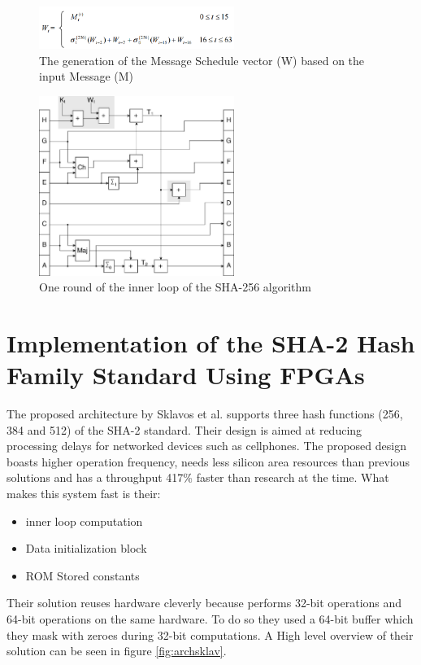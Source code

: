 \documentclass[conference]{IEEEtran}
\begin{document}
\begin{figure}[!t]
\centering
\includegraphics[width=2.5in]{messageSchedule}
\caption{The generation of the Message Schedule vector (W) based on the input Message (M)}
\label{fig:messageSchedule}
\end{figure}

\begin{figure}[!t]
\centering
\includegraphics[width=2.5in]{sha2round}
\caption{One round of the inner loop of the SHA-256 algorithm}
\label{fig:innerloop}
\end{figure}



\section{Implementation of the SHA-2 Hash Family Standard Using FPGAs} \label{sha2fam}
The proposed architecture by Sklavos et al. \cite{sklav} supports three hash functions (256, 384 and 512) of the SHA-2 standard. Their design is aimed at reducing processing delays for networked devices such as cellphones. The proposed design boasts higher operation frequency, needs less silicon area resources than previous solutions and has a throughput 417\% faster than research at the time. What makes this system fast is their:
\begin{itemize}
\item inner loop computation
\item Data initialization block
\item ROM Stored constants 
\end{itemize}
Their solution reuses hardware cleverly because performs 32-bit operations and 64-bit operations on the same hardware. To do so they used a 64-bit buffer which they mask with zeroes during 32-bit computations. A High level overview of their solution can be seen in figure \ref{fig:archsklav}. 
\end{document}
